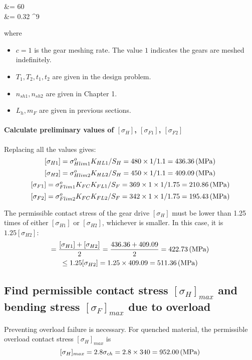 \begin{itemize}
\begin{flalign*}
	&= 60     \\
	&= 0.32 ^9
	\end{flalign*}
	where\begin{itemize}
		\item $ c=1 $ is the gear meshing rate. The value $ 1 $ indicates the gears are meshed indefinitely.
		\item $ T_1,T_2,t_1,t_2 $ are given in the design problem.
		\item $ n_{sh1}, n_{sh2} $ are given in Chapter 1.
		\item $ L_h, m_F $ are given in previous sections.
	\end{itemize}
\end{itemize}

\paragraph{Calculate preliminary values of $ [\sigma_H] $, $ [\sigma_{F1}] $, $ [\sigma_{F2}] $} Replacing all the values gives:\\
\[ [\sigma_{H1}] = \sigma_{Hlim1}^oK_{HL1}/S_H = 480\times 1/1.1 = 436.36 \, (\mathrm{MPa})\]
\[ [\sigma_{H2}] = \sigma_{Hlim2}^oK_{HL2}/S_H = 450\times 1/1.1 = 409.09 \, (\mathrm{MPa})\]
\[ [\sigma_{F1}] = \sigma_{Flim1}^oK_{FC}K_{FL1}/S_F = 369\times 1\times 1/1.75  = 210.86\, (\mathrm{MPa})\]
\[ [\sigma_{F2}] = \sigma_{Flim2}^oK_{FC}K_{FL2}/S_F = 342\times 1\times 1/1.75  = 195.43 \, (\mathrm{MPa})\]

The permissible contact stress of the gear drive $ [\sigma_H] $ must be lower than 1.25 times of either $ [\sigma_{H1}] $ or $ [\sigma_{H2}] $, whichever is smaller. In this case, it is $ 1.25[\sigma_{H2}]$:
\begin{multline*}
	[\sigma_H] =\dfrac{[\sigma_{H1}]+[\sigma_{H2}]}{2}= \dfrac{436.36+409.09}{2} = 422.73 \unitp{MPa}\\
	\leq 1.25[\sigma_{H2}] = 1.25\times 409.09= 511.36\unitp{MPa}
\end{multline*}

\subsection{Find permissible contact stress $ [\sigma_H]_{max} $ and bending stress $ [\sigma_F]_{max} $ due to overload}
Preventing overload failure is necessary. For quenched material, the permissible overload contact stress $ [\sigma_H]_{max} $ is
\[ [\sigma_H]_{max} = 2.8\sigma_{ch} = 2.8\times 340 = 952.00\, (\mathrm{MPa}) \]


